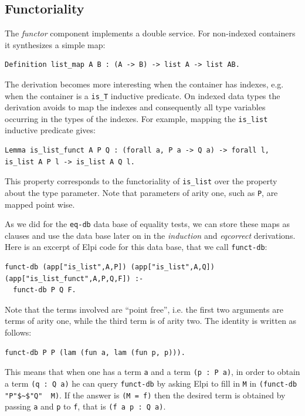 \documentclass[a4paper,UKenglish,cleveref, autoref]{lipics-v2019}
\newcommand{\derive}[1]{\emph{#1}}
\begin{document}
\subsection{Functoriality} %

The \derive{functor} component implements a double service.
For non-indexed containers it synthesizes a simple map:

\begin{lstlisting}
Definition list_map A B : (A -> B) -> list A -> list AB.
\end{lstlisting}

\noindent
The derivation becomes more interesting when the container has indexes,
e.g. when the container is a \lstinline+is_T+ inductive predicate.
On indexed data types the derivation avoids to map the indexes and
consequently all type variables occurring in the types of the indexes.
For example, mapping the \lstinline+is_list+ inductive predicate gives:

\begin{lstlisting}
Lemma is_list_funct A P Q : (forall a, P a -> Q a) -> forall l, is_list A P l -> is_list A Q l.
\end{lstlisting}

\noindent
This property corresponds to the functoriality of \lstinline+is_list+
over the property about the type parameter. Note that parameters of
arity one, such as \lstinline+P+, are mapped point wise.

As we did for the \lstinline+eq-db+ data base of equality tests, we
can store these maps as clauses and use the data base later on in the
\derive{induction} and \derive{eqcorrect} derivations.
Here is an excerpt of Elpi code for this data base, that we call
\lstinline+funct-db+:

\begin{lstlisting}[]
funct-db (app["is_list",A,P]) (app["is_list",A,Q]) (app["is_list_funct",A,P,Q,F]) :-
  funct-db P Q F.
\end{lstlisting}

\noindent
Note that the terms involved are ``point free'', i.e.
the first two arguments are terms of arity one, while
the third term is of arity two. %
The identity is written as follows:

\begin{lstlisting}[]
funct-db P P (lam (fun a, lam (fun p, p))).
\end{lstlisting}

\noindent
This means that when one has a term \lstinline+a+
and a term \lstinline+(p : P a)+, in order to
obtain a term \lstinline+(q : Q a)+ he can
query \lstinline+funct-db+ by asking Elpi
to fill in \lstinline+M+ in \lstinline+(funct-db "P"$~$"Q"  M)+.
If the answer is \lstinline+(M = f)+ then
the desired term is
obtained by passing
\lstinline+a+ and \lstinline+p+ to \lstinline+f+, that is
\lstinline+(f a p : Q a)+.
\end{document}
